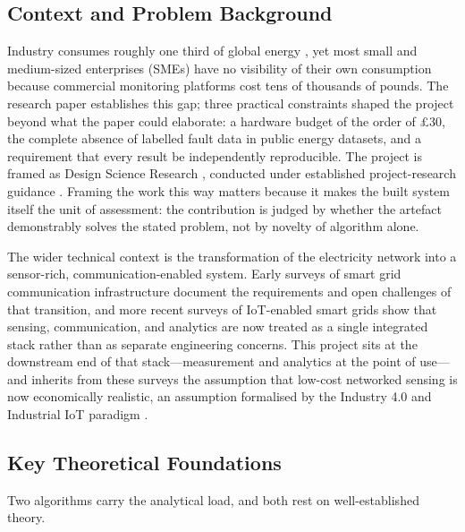 \documentclass[11pt,a4paper]{article}
\begin{document}
\subsection{Context and Problem Background}
Industry consumes roughly one third of global energy
\cite{international2022international}, yet most small and medium-sized
enterprises (SMEs) have no visibility of their own consumption because
commercial monitoring platforms cost tens of thousands of pounds. The research
paper establishes this gap; three practical constraints shaped the project
beyond what the paper could elaborate: a hardware budget of the order of
\pounds30, the complete absence of labelled fault data in public energy
datasets, and a requirement that every result be independently reproducible.
The project is framed as Design Science Research
\cite{hevner2004design,peffers2007design}, conducted under established
project-research guidance \cite{zina2021essential}. Framing the work this way
matters because it makes the built system itself the unit of assessment: the
contribution is judged by whether the artefact demonstrably solves the stated
problem, not by novelty of algorithm alone.

The wider technical context is the transformation of the electricity network
into a sensor-rich, communication-enabled system. Early surveys of smart grid
communication infrastructure \cite{fan2012smart,yan2012survey} document the
requirements and open challenges of that transition, and more recent surveys of
IoT-enabled smart grids \cite{goudarzi2022survey,kirmani2022survey} show that
sensing, communication, and analytics are now treated as a single integrated
stack rather than as separate engineering concerns. This project sits at the
downstream end of that stack---measurement and analytics at the point of
use---and inherits from these surveys the assumption that low-cost networked
sensing is now economically realistic, an assumption formalised by the Industry
4.0 and Industrial IoT paradigm \cite{munirathinam2020industry}.

\subsection{Key Theoretical Foundations}
Two algorithms carry the analytical load, and both rest on well-established
theory.
\end{document}

